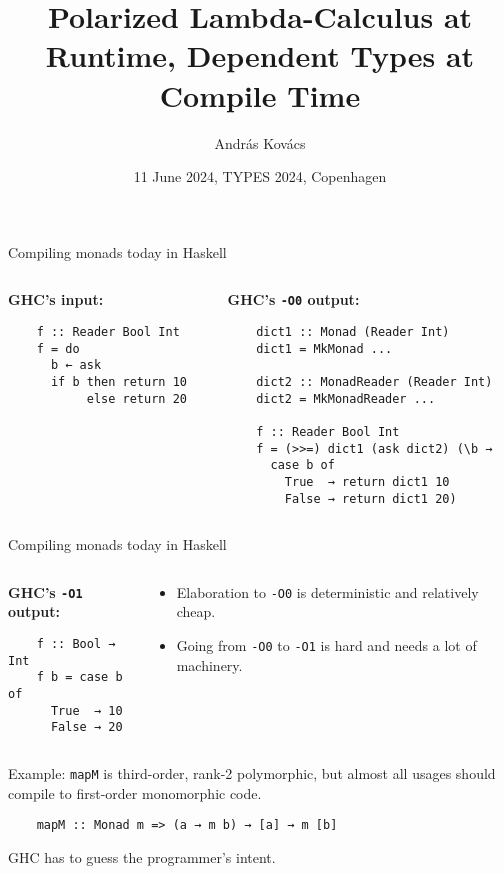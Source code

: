 \documentclass[dvipsnames,aspectratio=169]{beamer}
\title{Polarized Lambda-Calculus at Runtime, Dependent Types at Compile Time}
\author{András Kovács}
\institute{University of Gothenburg}
\date{11 June 2024, TYPES 2024, Copenhagen}
\newcommand{\ttt}[1]{{\texttt{#1}}}
\theoremstyle{remark}
\begin{document}
\frame{\titlepage}

\begin{frame}[fragile]{Compiling monads today in Haskell}

\begin{columns}
\begin{column}{0.3\textwidth}
\textbf{GHC's input:}
\begin{verbatim}
    f :: Reader Bool Int
    f = do
      b ← ask
      if b then return 10
           else return 20






\end{verbatim}
\end{column}
\begin{column}{0.5\textwidth}
\textbf{GHC's \texttt{-O0} output:}
\begin{verbatim}
    dict1 :: Monad (Reader Int)
    dict1 = MkMonad ...

    dict2 :: MonadReader (Reader Int)
    dict2 = MkMonadReader ...

    f :: Reader Bool Int
    f = (>>=) dict1 (ask dict2) (\b →
      case b of
        True  → return dict1 10
        False → return dict1 20)
\end{verbatim}
\end{column}
\end{columns}

\end{frame}


\begin{frame}[fragile]{Compiling monads today in Haskell}

\begin{columns}
\begin{column}{0.3\textwidth}
\textbf{GHC's \texttt{-O1} output:}
\begin{verbatim}
    f :: Bool → Int
    f b = case b of
      True  → 10
      False → 20
\end{verbatim}

\end{column}
\begin{column}{0.6\textwidth}
\begin{itemize}
  \item Elaboration to \texttt{-O0} is deterministic and relatively cheap.
  \item Going from \texttt{-O0} to \texttt{-O1} is \alert{hard} and needs
        a lot of machinery.
\end{itemize}
\end{column}
\end{columns}
\vspace{2em}

Example: \ttt{mapM} is third-order, rank-2 polymorphic, but almost all usages should
compile to first-order monomorphic code.
\begin{verbatim}
    mapM :: Monad m => (a → m b) → [a] → m [b]
\end{verbatim}

GHC has to guess the programmer's intent.
\vspace{1em}

\end{frame}
\end{document}
